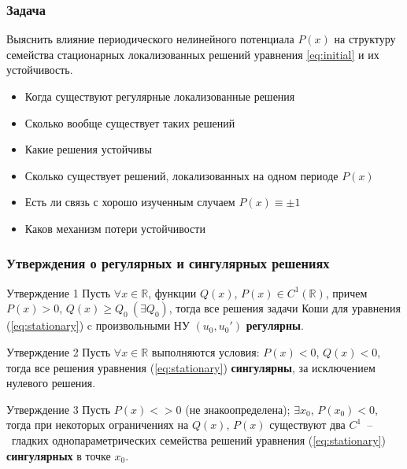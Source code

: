 \documentclass{beamer}
\newcommand{\qu}{\scalebox{1.25}{\bf {\color{ceruleanblue} ?}}}
\begin{document}
\begin{frame}
	\frametitle{Задача}
	
	Выяснить влияние периодического нелинейного потенциала $P(x)$ на структуру семейства стационарных локализованных решений уравнения \eqref{eq:initial} и их устойчивость.
	
	\begin{itemize}
		\item Когда существуют регулярные локализованные решения\qu
		\item Сколько вообще существует таких решений\qu
		\item Какие решения устойчивы\qu
		\item Сколько существует решений, локализованных на одном периоде $P(x)$\qu
		\item Есть ли связь с хорошо изученным случаем $P(x) \equiv \pm 1$\qu
		\item Каков механизм потери устойчивости\qu
	\end{itemize}
	
\end{frame}

\begin{frame}
	\frametitle{Утверждения о регулярных и сингулярных решениях}

	\begin{block}{Утверждение 1}
		Пусть $\forall x \in \mathbb{R}$, функции $Q(x)$, $P(x) \in C^1(\mathbb{R})$, причем $P(x) > 0$, $Q(x) \ge Q_0~(\exists Q_0)$, тогда все решения задачи Коши для уравнения (\ref{eq:stationary}) c произвольными НУ $(u_0, u_0')$ {\bf регулярны}\footnotemark[2]. 
	\end{block}

	\begin{block}{Утверждение 2}
		Пусть $\forall x \in \mathbb{R}$ выполняются условия: $P(x) < 0$, $Q(x) < 0$, тогда все решения уравнения (\ref{eq:stationary}) {\bf сингулярны}, за исключением нулевого решения\footnotemark[2].
	\end{block}

	\begin{block}{Утверждение 3}
		Пусть $P(x) <> 0$ (не знакоопределена); $\exists x_0$, $P(x_0) < 0$, тогда при некоторых ограничениях на $Q(x)$, $P(x)$ существуют два $C^1$~--~гладких однопараметрических семейства решений уравнения (\ref{eq:stationary}) {\bf сингулярных} в точке $x_0$\footnotemark[2].
	\end{block}

\end{frame}
\end{document}
